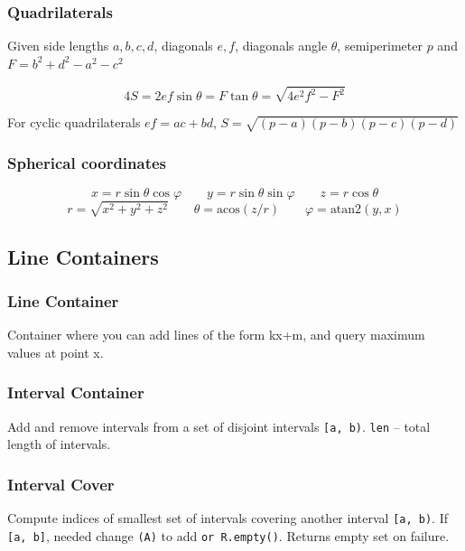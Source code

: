 \subsubsection{Quadrilaterals}

Given side lengths $a, b, c, d$, diagonals $e, f$, diagonals angle $\theta$, semiperimeter $p$ and \mbox{$F = b^2 + d^2 - a^2 - c^2$}

\vspace{-1em}
$$4S = 2ef\sin\theta = F\tan\theta = \sqrt{4e^2f^2 - F^2}$$

For cyclic quadrilaterals $ef = ac + bd$, $S = \sqrt{(p - a)(p - b)(p - c)(p - d)}$

\subsubsection{Spherical coordinates}

$$
x = r \sin \theta \cos \varphi \hspace{2em}
y = r \sin \theta \sin \varphi \hspace{2em}
z = r \cos \theta
$$
$$
r = \sqrt{x^2 + y^2 + z^2} \hspace{2em}
\theta = \text{acos}(z / r) \hspace{2em}
\varphi = \text{atan2}(y, x)
$$

\subsection{Line Containers}

\subsubsection{Line Container}

Container where you can add lines of the form kx+m, and query maximum values at point x.

\subsubsection{Interval Container}

Add and remove intervals from a set of disjoint intervals \verb|[a, b)|. \verb|len| -- total length of intervals.

\subsubsection{Interval Cover}

Compute indices of smallest set of intervals covering another interval \verb|[a, b)|.
If \verb|[a, b]|, needed change \verb|(A)| to add \verb|or R.empty()|.
Returns empty set on failure.


